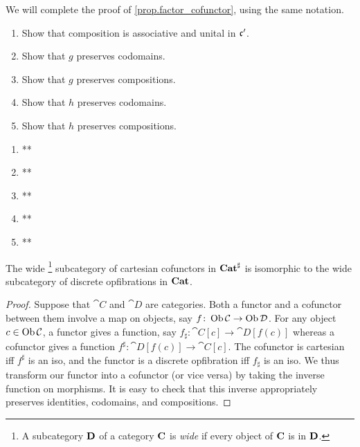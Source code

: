 \documentclass[Book-Poly]{subfiles}
\begin{document}
\begin{exercise}\label{exc.factor_cofunctor}
We will complete the proof of \cref{prop.factor_cofunctor}, using the same notation.
\begin{enumerate}
	\item Show that composition is associative and unital in $\mathfrak{c'}$.
	\item Show that $g$ preserves codomains.
	\item Show that $g$ preserves compositions.
	\item Show that $h$ preserves codomains.
	\item Show that $h$ preserves compositions.
\qedhere
\end{enumerate}
\begin{solution}
\begin{enumerate}
    \item **
    \item **
    \item **
    \item **
    \item **
\end{enumerate}
\end{solution}
\end{exercise}

\begin{proposition} \label{prop.cart_dopf}
The wide%
\footnote{A subcategory $\mathbf{D}$ of a category $\mathbf{C}$ is \emph{wide} if every object of $\mathbf{C}$ is in $\mathbf{D}$.}%
subcategory of cartesian cofunctors in $\mathbf{Cat}^\sharp$ is isomorphic to the wide subcategory of discrete opfibrations in $\mathbf{Cat}$.
\end{proposition}
\begin{proof}
Suppose that $\cat{C}$ and $\cat{D}$ are categories. Both a functor and a cofunctor between them involve a map on objects, say $f\colon\operatorname{Ob}\mathcal{C}\to\operatorname{Ob}\mathcal{D}$. For any object $c\in\operatorname{Ob}\mathcal{C}$, a functor gives a function, say $f_\sharp\colon\cat{C}[c]\to\cat{D}[f(c)]$ whereas a cofunctor gives a function $f^\sharp\colon\cat{D}[f(c)]\to\cat{C}[c]$. The cofunctor is cartesian iff $f^\sharp$ is an iso, and the functor is a discrete opfibration iff $f_\sharp$ is an iso. We thus transform our functor into a cofunctor (or vice versa) by taking the inverse function on morphisms. It is easy to check that this inverse appropriately preserves identities, codomains, and compositions.
\end{proof}

\end{document}
